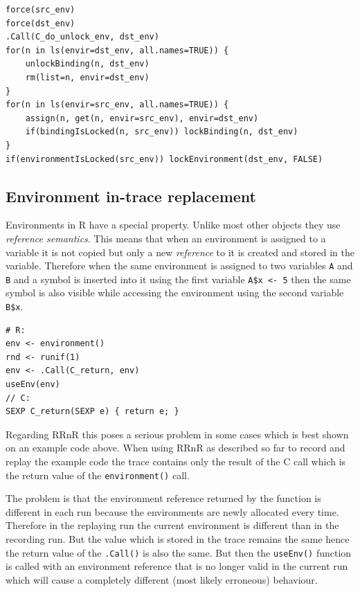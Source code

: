 \documentclass[thesis=M,english,hidelinks]{FITthesis}[2012/10/20]
\begin{document}
\begin{lstlisting}[style=filestyle, caption={The \lstinline|replace_environment()| function}]
force(src_env)
force(dst_env)
.Call(C_do_unlock_env, dst_env)
for(n in ls(envir=dst_env, all.names=TRUE)) {
	unlockBinding(n, dst_env)
	rm(list=n, envir=dst_env)
}
for(n in ls(envir=src_env, all.names=TRUE)) {
	assign(n, get(n, envir=src_env), envir=dst_env)
	if(bindingIsLocked(n, src_env)) lockBinding(n, dst_env)
}
if(environmentIsLocked(src_env)) lockEnvironment(dst_env, FALSE)
\end{lstlisting}
		
		\subsection{Environment in-trace replacement}
		Environments in R have a special property. Unlike most other objects they use \emph{reference semantics}. This means that when an environment is assigned to a variable it is not copied but only a new \emph{reference} to it is created and stored in the variable. Therefore when the same environment is assigned to two variables \lstinline|A| and \lstinline|B| and a symbol is inserted into it using the first variable \lstinline|A$x <- 5| then the same symbol is also visible while accessing the environment using the second variable \lstinline|B$x|.\par
		
\begin{lstlisting}[style=filestyle, caption={Example code where reference semantics cause the problem}]
# R:
env <- environment()
rnd <- runif(1)
env <- .Call(C_return, env)
useEnv(env)
// C:
SEXP C_return(SEXP e) { return e; }
\end{lstlisting}

		Regarding RRnR this poses a serious problem in some cases which is best shown on an example code above. When using RRnR as described so far to record and replay the example code the trace contains only the result of the C call which is the return value of the \lstinline|environment()| call.\par
		
		The problem is that the environment reference returned by the function is different in each run because the environments are newly allocated every time. Therefore in the replaying run the current environment is different than in the recording run. But the value which is stored in the trace remains the same hence the return value of the \lstinline|.Call()| is also the same. But then the \lstinline|useEnv()| function is called with an environment reference that is no longer valid in the current run which will cause a completely different (most likely erroneous) behaviour.\par
		
\end{document}
